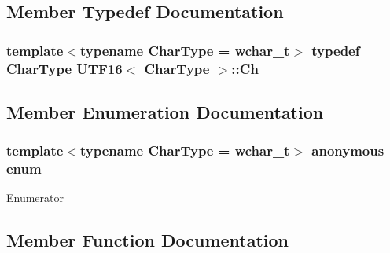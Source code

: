 \subsection{Member Typedef Documentation}
\subsubsection[{\texorpdfstring{Ch}{Ch}}]{\setlength{\rightskip}{0pt plus 5cm}template$<$typename Char\+Type  = wchar\+\_\+t$>$ typedef Char\+Type {\bf U\+T\+F16}$<$ Char\+Type $>$\+::{\bf Ch}}\hypertarget{structUTF16_a811680d50447c98be4fd94c0a27504bb}{}\label{structUTF16_a811680d50447c98be4fd94c0a27504bb}


\subsection{Member Enumeration Documentation}
\subsubsection[{\texorpdfstring{anonymous enum}{anonymous enum}}]{\setlength{\rightskip}{0pt plus 5cm}template$<$typename Char\+Type  = wchar\+\_\+t$>$ anonymous enum}\hypertarget{structUTF16_a286def80fa945e4d43d52fd398f981da}{}\label{structUTF16_a286def80fa945e4d43d52fd398f981da}
\begin{Desc}
\item[Enumerator]\par
\begin{description}
\item[{\em 
support\+Unicode\hypertarget{structUTF16_a286def80fa945e4d43d52fd398f981daa98b69a56ef3548af9741fff3fcb7b28c}{}\label{structUTF16_a286def80fa945e4d43d52fd398f981daa98b69a56ef3548af9741fff3fcb7b28c}
}]\end{description}
\end{Desc}


\subsection{Member Function Documentation}
